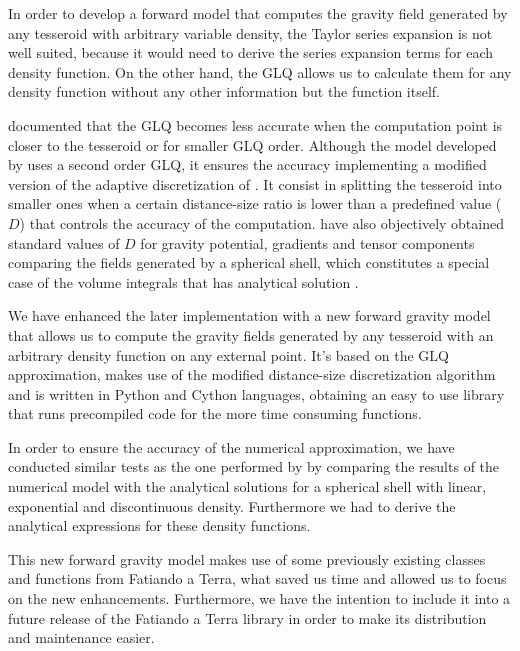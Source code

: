 \documentclass[extra]{gji}
\begin{document}
In order to develop a forward model that computes the gravity field generated by any tesseroid with arbitrary variable density, the Taylor series expansion is not well suited, because it would need to derive the series expansion terms for each density function.
On the other hand, the GLQ allows us to calculate them for any density function without any other information but the function itself.

\citet{Ku1977} documented that the GLQ becomes less accurate when the computation point is closer to the tesseroid or for smaller GLQ order. 
Although the model developed by \citet{Uieda2016} uses a second order GLQ, it ensures the accuracy implementing a modified version of the adaptive discretization of \citet{Li2011}.
It consist in splitting the tesseroid into smaller ones when a certain distance-size ratio is lower than a predefined value ($D$) that controls the accuracy of the computation. 
\citet{Uieda2016} have also objectively obtained standard values of $D$ for gravity potential, gradients and tensor components comparing the fields generated by a spherical shell, which constitutes a special case of the volume integrals that has analytical solution \citep{LaFehr1991, Mikuska2006, Grombein2013}.

We have enhanced the later implementation with a new forward gravity model that allows us to compute the gravity fields generated by any tesseroid with an arbitrary density function on any external point.
It's based on the GLQ approximation, makes use of the modified distance-size discretization algorithm and is written in Python and Cython languages, obtaining an easy to use library that runs precompiled code for the more time consuming functions.

In order to ensure the accuracy of the numerical approximation, we have conducted similar tests as the one performed by \citet{Uieda2016} by comparing the results of the numerical model with the analytical solutions for a spherical shell with linear, exponential and discontinuous density.
Furthermore we had to derive the analytical expressions for these density functions.

This new forward gravity model makes use of some previously existing classes and functions from Fatiando a Terra, what saved us time and allowed us to focus on the new enhancements.
Furthermore, we have the intention to include it into a future release of the Fatiando a Terra library in order to make its distribution and maintenance easier.
\end{document}
